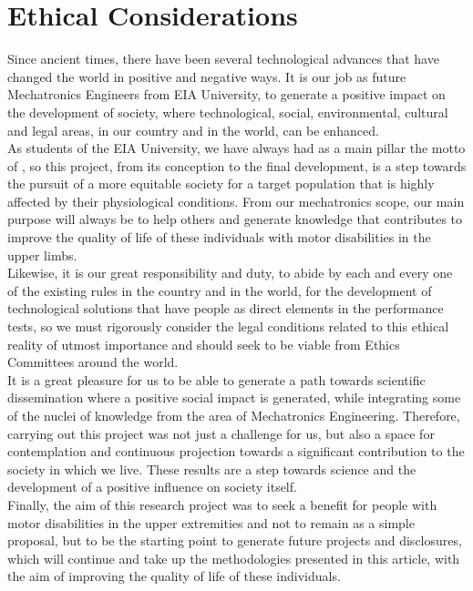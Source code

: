 \documentclass[11pt]{report} %
\begin{document}
\chapter{Ethical Considerations}

Since ancient times, there have been several technological advances that have changed the world in positive and negative ways. It is our job as future Mechatronics Engineers from EIA University, to generate a positive impact on the development of society, where technological, social, environmental, cultural and legal areas, in our country and in the world, can be enhanced.\\

As students of the EIA University, we have always had as a main pillar the motto of , so this project, from its conception to the final development, is a step towards the pursuit of a more equitable society for a target population that is highly affected by their physiological conditions. From our mechatronics scope, our main purpose will always be to help others and generate knowledge that contributes to improve the quality of life of these individuals with motor disabilities in the upper limbs.\\

Likewise, it is our great responsibility and duty, to abide by each and every one of the existing rules in the country and in the world, for the development of technological solutions that have people as direct elements in the performance tests, so we must rigorously consider the legal conditions related to this ethical reality of utmost importance and should seek to be viable from Ethics Committees around the world.\\

It is a great pleasure for us to be able to generate a path towards scientific dissemination where a positive social impact is generated, while integrating some of the nuclei of knowledge from the area of Mechatronics Engineering. Therefore, carrying out this project was not just a challenge for us, but also a space for contemplation and continuous projection towards a significant contribution to the society in which we live. These results are a step towards science and the development of a positive influence on society itself.\\

Finally, the aim of this research project was to seek a benefit for people with motor disabilities in the upper extremities and not to remain as a simple proposal, but to be the starting point to generate future projects and disclosures, which will continue and take up the methodologies presented in this article, with the aim of improving the quality of life of these individuals.\\



\begin{sloppypar}
    
    
\end{sloppypar}
\end{document}

